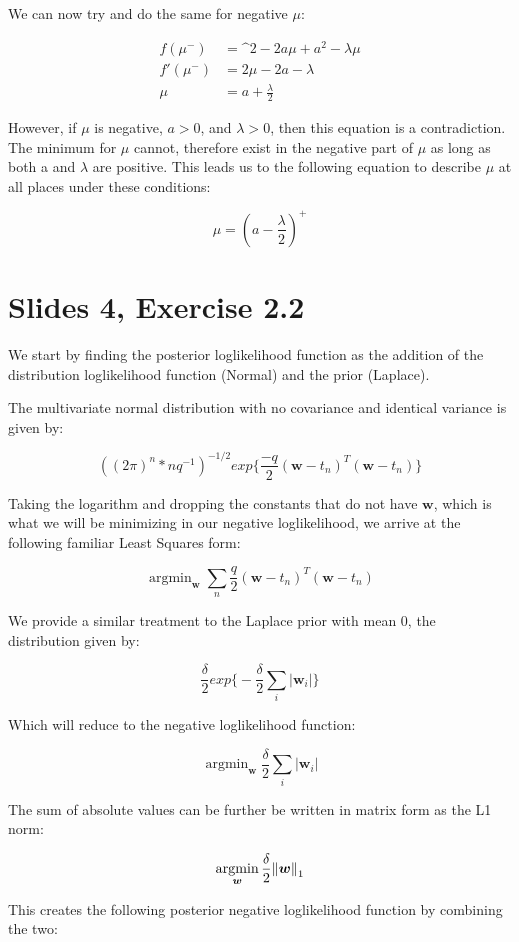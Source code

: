 \documentclass[a4paper,12pt]{article}
\DeclareMathOperator*{\argmin}{argmin}
\begin{document}
We can now try and do the same for negative $\mu$:

\begin{align*}
f(\mu^-) &= \^2 - 2a\mu + a^2 - \lambda\mu \\
f'(\mu^-) &= 2\mu - 2a - \lambda \\
\mu &= a + \frac{\lambda}{2}
\end{align*}

However, if $\mu$ is negative, $a > 0$, and $\lambda > 0$, then this equation is a contradiction. The minimum for $\mu$ cannot, therefore exist in the negative part of $\mu$ as long as both a and $\lambda$ are positive. This leads us to the following equation to describe $\mu$ at all places under these conditions:

$$
\mu = (a - \frac{\lambda}{2})^+
$$

\section{Slides 4, Exercise 2.2}
We start by finding the posterior loglikelihood function as the addition of the distribution loglikelihood function (Normal) and the prior (Laplace).

The multivariate normal distribution with no covariance and identical variance is given by: 

$$
((2\pi)^n*nq^{-1})^{-1/2}exp\bigg\{ \frac{-q}{2}(\bm{w} - t_n)^{T}(\bm{w} - t_n) \bigg\}
$$

Taking the logarithm and dropping the constants that do not have $\bm{w}$, which is what we will be  minimizing in our negative loglikelihood, we arrive at the following familiar Least Squares form:

$$
\argmin_{\bm{w}} \sum_n \frac{q}{2}(\bm{w} - t_n)^{T}(\bm{w} - t_n)
$$

We provide a similar treatment to the Laplace prior with mean 0, the distribution given by: 

$$
\frac{\delta}{2} exp \bigg\{ -\frac{\delta}{2} \sum_i |\bm{w}_i| \bigg\}
$$

Which will reduce to the negative loglikelihood function:

$$
\argmin_{\bm{w}} \frac{\delta}{2} \sum_i |\bm{w}_i|
$$

The sum of absolute values can be further be written in matrix form as the L1 norm: 

$$
\argmin_{\bm{w}} \frac{\delta}{2} \norm{ \bm{w} }_1
$$

This creates the following posterior negative loglikelihood function by combining the two:
\end{document}
